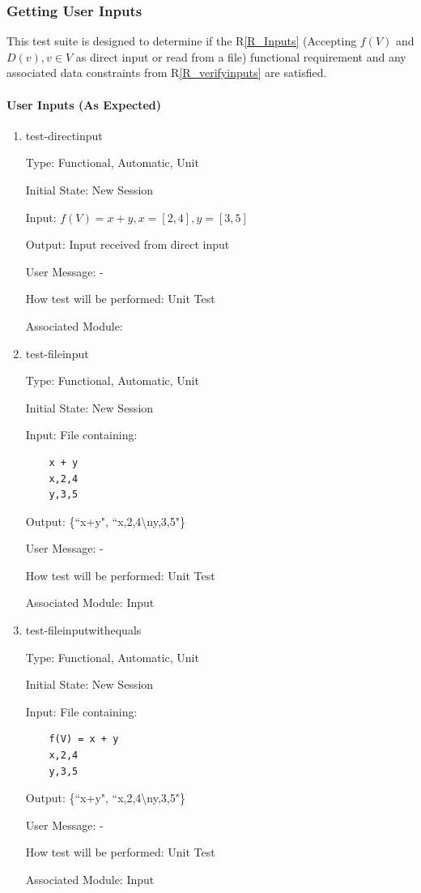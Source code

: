 \documentclass[12pt, titlepage]{article}
\newcommand{\rref}[1]{R\ref{#1}}
\begin{document}
\subsubsection{Getting User Inputs}
\label{tests_gettingInputs}
This test suite is designed to determine if the \rref{R_Inputs} (Accepting 
$f(V)$ and $D(v), v \in V$ as direct input or read from a file) functional 
requirement and any associated data constraints from 
\rref{R_verifyinputs} are satisfied.

\paragraph{User Inputs (As Expected)}

\begin{enumerate}
	
	\item{test-directinput}
	
	Type: Functional, Automatic, Unit
	
	Initial State: New Session
	
	Input: $f(V) = x + y, x = [2,4], y = [3,5]$
	
	Output: Input received from direct input
	
	User Message: - 
	
	How test will be performed: Unit Test
	
	Associated Module: \\
	
	\item{test-fileinput}
	
	Type: Functional, Automatic, Unit
	
	Initial State: New Session
	
	Input: File containing:
	\begin{lstlisting}
	x + y
	x,2,4
	y,3,5
	\end{lstlisting}
	
	Output: \{``x+y", ``x,2,4\textbackslash ny,3,5"\}
	
	User Message: - 
	
	How test will be performed: Unit Test
	
	Associated Module: Input\\
	
	\item{test-fileinputwithequals}

	Type: Functional, Automatic, Unit
	
	Initial State: New Session
	
	Input: File containing:
	\begin{lstlisting}
	f(V) = x + y
	x,2,4
	y,3,5
	\end{lstlisting}
	
	Output: \{``x+y", ``x,2,4\textbackslash ny,3,5"\}
	
	User Message: - 
	
	How test will be performed: Unit Test
	
	Associated Module: Input\\
\end{enumerate}
	
\end{document}
